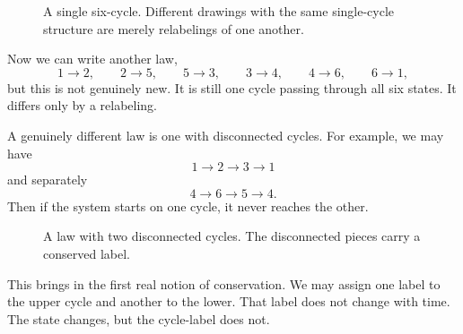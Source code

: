 \begin{figure}
\centering
{}
\caption{A single six-cycle. Different drawings with the same single-cycle structure are merely relabelings of one another.}
\end{figure}

Now we can write another law,
\[
1\to 2,\qquad 2\to 5,\qquad 5\to 3,\qquad 3\to 4,\qquad 4\to 6,\qquad 6\to 1,
\]
but this is not genuinely new. It is still one cycle passing through all six states. It differs only by a relabeling.

A genuinely different law is one with disconnected cycles. For example, we may have
\[
1\to 2\to 3\to 1
\]
and separately
\[
4\to 6\to 5\to 4.
\]
Then if the system starts on one cycle, it never reaches the other.

\begin{figure}
\centering
{}
\caption{A law with two disconnected cycles. The disconnected pieces carry a conserved label.}
\end{figure}

This brings in the first real notion of conservation. We may assign one label to the upper cycle and another to the lower. That label does not change with time. The state changes, but the cycle-label does not.

